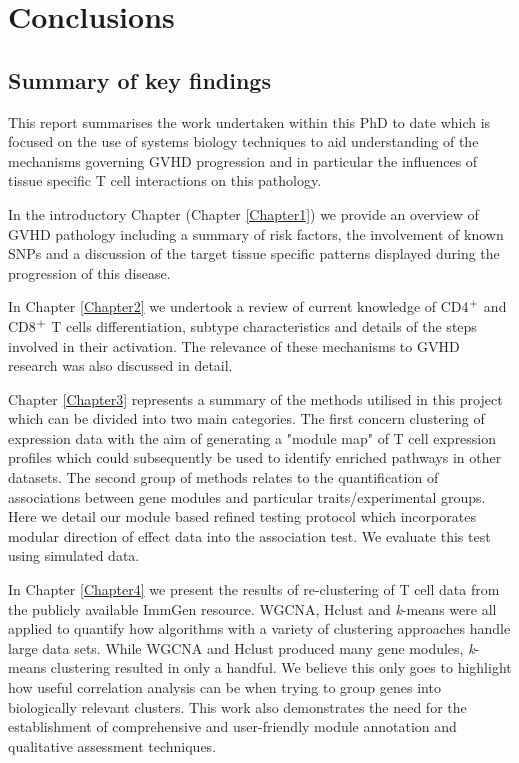 
\chapter{Conclusions} %

\label{Chapter6} %


\section {Summary of key findings}

This report summarises the work undertaken within this PhD to date which is focused on the use of systems biology techniques to aid understanding of the mechanisms governing GVHD progression and in particular the influences of tissue specific T cell interactions on this pathology. 

In the introductory Chapter (Chapter \ref{Chapter1}) we provide an overview of GVHD pathology including a summary of risk factors, the involvement of known SNPs and a discussion of the target tissue specific patterns displayed during the progression of this disease. 

In Chapter \ref{Chapter2} we undertook a review of current knowledge of CD4$\textsuperscript{+}$ and CD8$\textsuperscript{+}$ T cells differentiation, subtype characteristics and details of the steps involved in their activation. The relevance of these mechanisms to GVHD research was also discussed in detail. 

Chapter \ref{Chapter3} represents a summary of the methods utilised in this project which can be divided into two main categories. The first concern clustering of expression data with the aim of generating a "module map" of T cell expression profiles which could subsequently be used to identify enriched pathways in other datasets. The second group of methods relates to the quantification of associations between gene modules and particular traits/experimental groups. Here we detail our module based refined testing protocol which incorporates modular direction of effect data into the association test. We evaluate this test using simulated data.

In Chapter \ref{Chapter4} we present the results of re-clustering of T cell data from the publicly available ImmGen resource. WGCNA, Hclust and \textit{k}-means were all applied to quantify how algorithms with a variety of clustering approaches handle large data sets. While WGCNA and Hclust produced many gene modules, \textit{k}-means clustering resulted in only a handful. We believe this only goes to highlight how useful correlation analysis can be when trying to group genes into biologically relevant clusters. This work also demonstrates the need for the establishment of comprehensive and user-friendly module annotation and qualitative assessment techniques.

